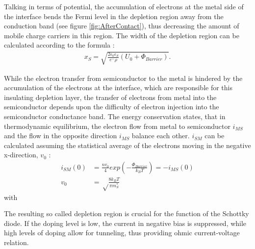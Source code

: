 \documentclass[12pt]{article}
\begin{document}
Talking in terms of potential, the accumulation of electrons at the metal side of the interface bends the Fermi level in the depletion region away from the conduction band (see figure \ref{fig:AfterContact}), thus decreasing the amount of mobile charge carriers in this region.
The width of the depletion region can be calculated according to the formula :
\begin{align}
 \label{eq:DeplRegion}
 x_S = \sqrt{\frac{2 \epsilon _0 \epsilon _S}{e^- \rho}(U_0 + \Phi_{Barrier})}.
\end{align}

While the electron transfer from semiconductor to the metal is hindered by the accumulation of the electrons at the interface, which are responsible for this insulating depletion layer, the transfer of electrons from metal into the semiconductor depends upon the difficulty of electron injection into the semiconductor conductance band. The energy conservation states, that in thermodynamic equilibrium, the electron flow from metal to semiconductor $i_{MS}$ and the flow in the opposite direction $i _{MS}$ balance each other. $i_{SM}$ can be calculated assuming the statistical average of the electrons moving in the negative x-direction, $v_0$ \cite{Fundamentals}:
\begin{align}
i_{SM}(0) & = \frac{n v_0} {4} exp \left( - \frac{\Phi _{Barrier}}{k_B T} \right) = -i_{MS}(0) \\
v_0 & = \sqrt\frac{8k_B T}{\pi m_S^*}
\end{align}
with 


The resulting so called depletion region is crucial for the function of the Schottky diode. If the doping level is low, the current in negative bias is suppressed, while high levels of doping allow for tunneling, thus providing ohmic current-voltage relation.
\end{document}
